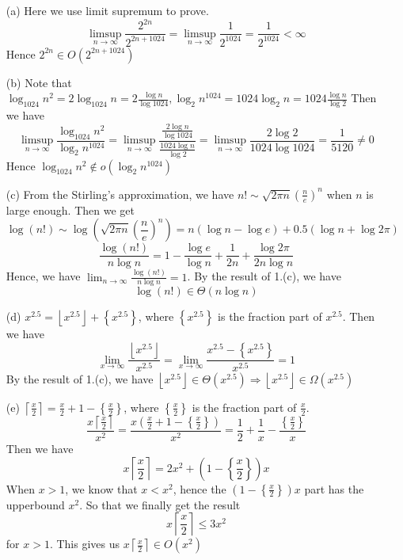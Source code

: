 \documentclass[12pt,a4paper]{article}
\begin{document}
\begin{enumerate}
    \item[(a)] 
        Here we use limit supremum to prove. 
        \[
            \limsup_{n\to\infty} \frac{2^{2n}}{2^{2n+1024}}=\limsup_{n\to\infty} \frac{1}{2^{1024}} = \frac{1}{2^{1024}} < \infty
        \]
        Hence $2^{2n}\in O(2^{2n+1024})$
    \item[(b)]
        Note that $\log_{1024}n^{2} = 2 \log_{1024} n = 2\frac{\log n}{\log 1024}, \log_{2}n^{1024} = 1024 \log_{2} n = 1024 \frac{\log n}{\log 2}$
        Then we have
        \[
            \limsup_{n\to\infty} \frac{\log_{1024}n^{2}}{\log_{2}n^{1024}} = \limsup_{n\to\infty} \frac{\frac{2\log n}{\log 1024}}{\frac{1024\log n}{\log 2}} = \limsup_{n\to\infty} \frac{2 \log 2}{1024 \log 1024} = \frac{1}{5120} \neq 0
        \]
        Hence $\log_{1024} n^{2} \notin o(\log_{2} n^{1024})$
    \item[(c)]
        From the Stirling's approximation, we have $n!\sim \sqrt{2\pi n}\left(\frac{n}{e}\right)^{n}$ when $n$ is large enough.
        Then we get 
        \[
            \log(n!) \sim \log\left(\sqrt{2\pi n}\left(\frac{n}{e}\right)^{n}\right) = n(\log n - \log e) + 0.5(\log {n} + \log 2\pi)
        \]
        \[
            \frac{\log(n!)}{n\log n} = 1 - \frac{\log e}{\log n} + \frac{1}{2n} + \frac{\log 2\pi}{2n\log n}
        \]
        Hence, we have $\lim_{n\to\infty} \frac{\log(n!)}{n\log n} = 1$.
        By the result of 1.(c), we have $$\log(n!) \in \Theta(n\log n)$$
    \item[(d)]
        $x^{2.5} = \left\lfloor x^{2.5}\right\rfloor + \left\{ x^{2.5}\right\} $, where $\left\{ x^{2.5}\right\} $ is the fraction part of $x^{2.5}$.
        Then we have
        \[
            \lim_{x\to\infty} \frac{\left\lfloor x^{2.5}\right\rfloor}{x^{2.5}} = \lim_{x\to\infty} \frac{x^{2.5} - \left\{ x^{2.5}\right\}}{x^{2.5}} = 1
        \]
        By the result of 1.(c), we have $\left\lfloor x^{2.5}\right\rfloor \in \Theta(x^{2.5})\Rightarrow \left\lfloor x^{2.5}\right\rfloor \in \Omega(x^{2.5})$
    \item[(e)]
        $\left\lceil \frac{x}{2}\right\rceil = \frac{x}{2} + 1 - \left\{ \frac{x}{2}\right\}$, where $\left\{ \frac{x}{2}\right\} $ is the fraction part of $\frac{x}{2}$.
        \[
            \frac{x\left\lceil \frac{x}{2}\right\rceil}{x^2} = \frac{x(\frac{x}{2} + 1 - \left\{ \frac{x}{2}\right\})}{x^2} = \frac{1}{2} + \frac{1}{x} - \frac{\left\{ \frac{x}{2}\right\}}{x}
        \]
        Then we have
        \[
            x\left\lceil \frac{x}{2}\right\rceil = 2x^2 + \left(1-\left\{\frac{x}{2}\right\} \right)x
        \]
        When $x>1$, we know that $x < x^2$, hence the $\left(1-\left\{\frac{x}{2}\right\} \right)x$ part has the upperbound $x^2$.
        So that we finally get the result
        \[
            x\left\lceil \frac{x}{2}\right\rceil \leq 3x^2 
        \]
        for $x>1$.
        This gives us $x\left\lceil \frac{x}{2}\right\rceil \in O(x^2)$
\end{enumerate}
\end{document}
